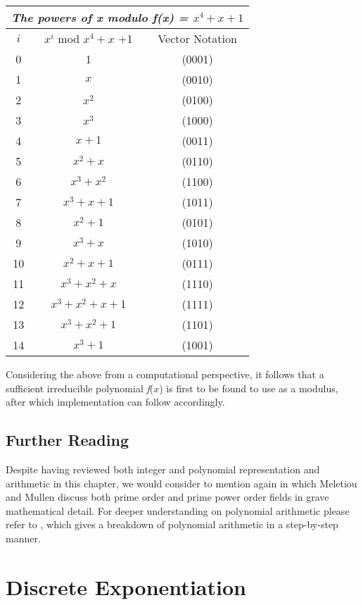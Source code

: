 \documentclass[iwp,first]{luthesis}
\begin{document}
\begin{center}
\begin{tabular}{|c|c|c|}
\hline
\multicolumn{3}{|c|}{\textit{The powers of x modulo f(x) = $x^4 + x +1$}} \\
\hline
$i$ & $x^{i}$ mod $x^4 + x$ +1 & Vector Notation \\ \hline
0 & 1 & (0001) \\ 
1 & $x$ & (0010) \\
2 & $x^2$ & (0100) \\ 
3 & $x^3$ & (1000) \\
4 & $x+1$ & (0011) \\
5 & $x^2 + x$ & (0110)\\
6 & $x^3 + x^2$ & (1100)\\
7 & $x^3 + x +1$ & (1011)\\
8 & $x^2 + 1$ & (0101)\\
9 & $x^3 + x$ & (1010)\\
10 & $x^2 + x + 1$ & (0111)\\
11 & $x^3 + x^2 + x$ & (1110)\\
12 & $x^3 + x^2 + x + 1$ & (1111)\\
13 & $x^3 + x^2 +1$ & (1101)\\
14 & $x^3 + 1$ & (1001)\\
\hline
\end{tabular}
\end{center}

Considering the above from a computational perspective, it follows that a sufficient irreducible polynomial \textit{f}($x$) is first to be found to use as a modulus, after which implementation can follow accordingly. 

\subsection{Further Reading}

Despite having reviewed both integer and polynomial representation and arithmetic in this chapter, we would consider to mention \cite{NDL} again in which Meletiou and Mullen discuss both prime order and prime power order fields in grave mathematical detail. For deeper understanding on polynomial arithmetic please refer to \cite{CNS}, which gives a breakdown of polynomial arithmetic in a step-by-step manner.

\section{Discrete Exponentiation}
\end{document}
